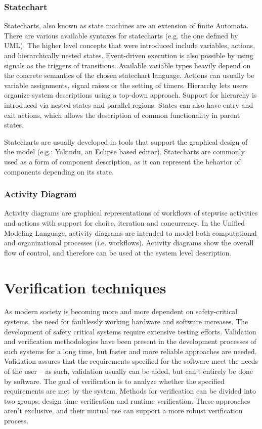 \subsubsection{Statechart}

Statecharts, also known as state machines are an extension of finite Automata. There are various available syntaxes for statecharts (e.g. the one defined by UML\citep{stcuml}). The higher level concepts that were introduced include variables, actions, and hierarchically nested states. Event-driven execution is also possible by using signals as the triggers of transitions. Available variable types heavily depend on the concrete semantics of the chosen statechart language. Actions can usually be variable assignments, signal raises or the setting of timers. Hierarchy lets users organize system descriptions using a top-down approach. Support for hierarchy is introduced via nested states and parallel regions. States can also have entry and exit actions, which allows the description of common functionality in parent states\citep{stcmove}.%

Statecharts are usually developed in tools that support the graphical design of the model (e.g.: Yakindu\citep{yakinduu}, an Eclipse based editor).
Statecharts are commonly used as a form of component description, as it can represent the behavior of components depending on its state.

\subsubsection{Activity Diagram}

Activity diagrams are graphical representations of workflows of stepwise activities and actions with support for choice, iteration and concurrency. In the Unified Modeling Language, activity diagrams are intended to model both computational and organizational processes (i.e. workflows). Activity diagrams show the overall flow of control, and therefore can be used at the system level description.

\section{Verification techniques} 

As modern society is becoming more and more dependent on safety-critical systems, the need for faultlessly working hardware and software increases. The development of safety critical systems require extensive testing efforts. Validation and verification methodologies have been present in the development processes of such systems for a long time\citep{ieee1012}, but faster and more reliable approaches are needed. Validation assures that the requirements specified for the software meet the needs of the user -- as such, validation usually can be aided, but can’t entirely be done by software. The goal of verification is to analyze whether the specified requirements are met by the system. Methods for verification can be divided into two groups: design time verification and runtime verification. These approaches aren't exclusive, and their mutual use can support a more robust verification process.


